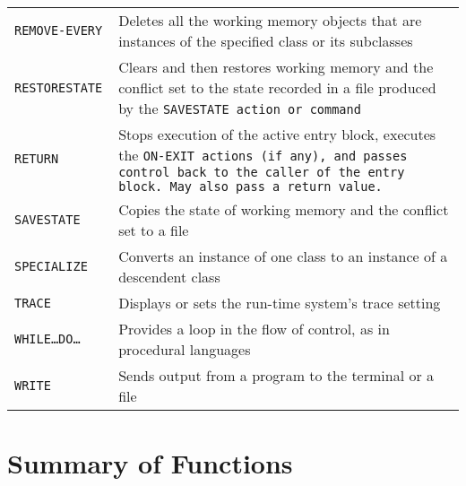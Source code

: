 \begin{longtable}{p{4cm}p{11cm}}
  \tt{REMOVE-EVERY} & Deletes all the working memory objects that  
                      are instances of the specified class or its  
                      subclasses \\\addlinespace
  \tt{RESTORESTATE} & Clears and then restores working memory and  
                      the conflict set to the state recorded in a  
                      file produced by the \tt{SAVESTATE} action or     
                      command  \\\addlinespace
  \tt{RETURN} & Stops execution of the active entry block,    
                executes the \tt{ON-EXIT} actions (if any), and    
                passes control back to the caller of the entry
                block. May also pass a return value. \\\addlinespace
  \tt{SAVESTATE} & Copies the state of working memory and the    
                   conflict set to a file \\\addlinespace
  \tt{SPECIALIZE} & Converts an instance of one class to an 
                    instance of a descendent class  \\\addlinespace
  \tt{TRACE} & Displays or sets the run-time system's trace  
               setting \\\addlinespace
  \tt{WHILE}\ldots\tt{DO}\ldots & Provides a loop in the flow of control, as in
                                  procedural languages \\\addlinespace
  \tt{WRITE} & Sends output from a program to the terminal or
               a file \\
  \bottomrule
\end{longtable}

\section{Summary of Functions}


